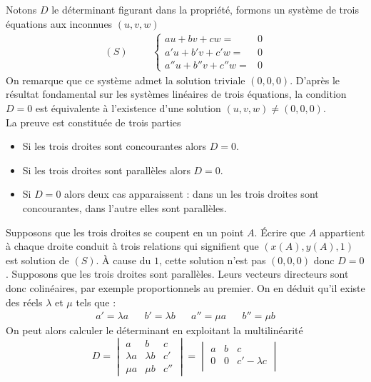 \begin{demo}
 Notons $D$ le déterminant figurant dans la propriété, formons un système de trois équations aux inconnues $(u,v,w)$
\begin{align*}
 (S) \hspace{1cm} \left\lbrace 
\begin{aligned}
 au+bv+cw =&0\\
a'u+b'v+c'w =&0\\
a''u+b''v+c''w =&0
\end{aligned}
\right. 
\end{align*}
On remarque que ce système admet la solution triviale $(0,0,0)$. D'après le résultat fondamental sur les systèmes linéaires de trois équations, la condition $D=0$ est équivalente à l'existence d'une solution $(u,v,w)\neq(0,0,0)$.\\
La preuve est constituée de trois parties
\begin{itemize}
 \item Si les trois droites sont concourantes alors $D=0$.
\item Si les trois droites sont parallèles alors $D=0$.
\item Si $D=0$ alors deux cas apparaissent : dans un les trois droites sont concourantes, dans l'autre elles sont parallèles.
\end{itemize}
Supposons que les trois droites se coupent en un point $A$. \'Ecrire que $A$ appartient à chaque droite conduit à trois relations qui signifient que $(x(A),y(A),1)$ est solution de $(S)$. \`A cause du $1$, cette solution n'est pas $(0,0,0)$ donc $D=0$.\newline
Supposons que les trois droites sont parallèles. Leurs vecteurs directeurs sont donc colinéaires, par exemple proportionnels au premier. On en déduit qu'il existe des réels $\lambda$ et $\mu$ tels que :
\begin{align*}
 a'=\lambda a & & b'=\lambda b & & a''=\mu a & & b'' =\mu b
\end{align*}
On peut alors calculer le déterminant en exploitant la multilinéarité 
\begin{displaymath}
 D =
\begin{vmatrix}
 a & b & c \\
\lambda a & \lambda b & c' \\
\mu a & \mu b & c'' 
\end{vmatrix}
=\begin{vmatrix}
 a & b & c \\
0 & 0 & c'-\lambda c \\

\end{vmatrix}
\end{displaymath}
\end{demo}
